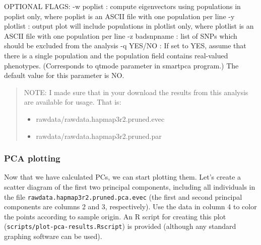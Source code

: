 \documentclass[
]{book}
\providecommand{\tightlist}{%
  \setlength{\itemsep}{0pt}\setlength{\parskip}{0pt}}
\begin{document}
OPTIONAL FLAGS:
-w poplist : compute eigenvectors using populations in poplist only,
where poplist is an ASCII file with one population per line
-y plotlist : output plot will include populations in plotlist only,
where plotlist is an ASCII file with one population per line
-z badsnpname : list of SNPs which should be excluded from the analysis
-q YES/NO : If set to YES, assume that there is a single population and
the population field contains real-valued phenotypes.
(Corresponds to qtmode parameter in smartpca program.)
The default value for this parameter is NO.

\begin{quote}
NOTE: I made sure that in your download the results from this analysis are available for usage. That is:

\begin{itemize}
\tightlist
\item
  rawdata/rawdata.hapmap3r2.pruned.evec
\item
  rawdata/rawdata.hapmap3r2.pruned.par
\end{itemize}
\end{quote}

\hypertarget{pca-plotting}{%
\subsubsection{PCA plotting}\label{pca-plotting}}

Now that we have calculated PCs, we can start plotting them. Let's create a scatter diagram of the first two principal components, including all individuals in the file \texttt{rawdata.hapmap3r2.pruned.pca.evec} (the first and second principal components are columns 2 and 3, respectively). Use the data in column 4 to color the points according to sample origin. An R script for creating this plot (\texttt{scripts/plot-pca-results.Rscript}) is provided (although any standard graphing software can be used).
\end{document}
